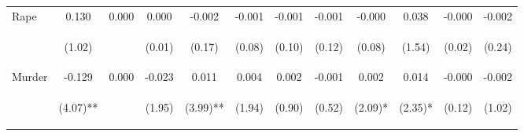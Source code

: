 \begin{tabular}{lccccccccccc}
\noalign{\smallskip}Rape & 0.130 & 0.000 & 0.000 & -0.002 & -0.001 & -0.001 & -0.001 & -0.000 & 0.038 & -0.000 & -0.002\\
 & \begin{footnotesize}(1.02)\end{footnotesize} & \begin{footnotesize}\end{footnotesize} & \begin{footnotesize}(0.01)\end{footnotesize} & \begin{footnotesize}(0.17)\end{footnotesize} & \begin{footnotesize}(0.08)\end{footnotesize} & \begin{footnotesize}(0.10)\end{footnotesize} & \begin{footnotesize}(0.12)\end{footnotesize} & \begin{footnotesize}(0.08)\end{footnotesize} & \begin{footnotesize}(1.54)\end{footnotesize} & \begin{footnotesize}(0.02)\end{footnotesize} & \begin{footnotesize}(0.24)\end{footnotesize}\\
\noalign{\smallskip}Murder & -0.129 & 0.000 & -0.023 & 0.011 & 0.004 & 0.002 & -0.001 & 0.002 & 0.014 & -0.000 & -0.002\\
 & \begin{footnotesize}(4.07)**\end{footnotesize} & \begin{footnotesize}\end{footnotesize} & \begin{footnotesize}(1.95)\end{footnotesize} & \begin{footnotesize}(3.99)**\end{footnotesize} & \begin{footnotesize}(1.94)\end{footnotesize} & \begin{footnotesize}(0.90)\end{footnotesize} & \begin{footnotesize}(0.52)\end{footnotesize} & \begin{footnotesize}(2.09)*\end{footnotesize} & \begin{footnotesize}(2.35)*\end{footnotesize} & \begin{footnotesize}(0.12)\end{footnotesize} & \begin{footnotesize}(1.02)\end{footnotesize}\\

\end{tabular}
